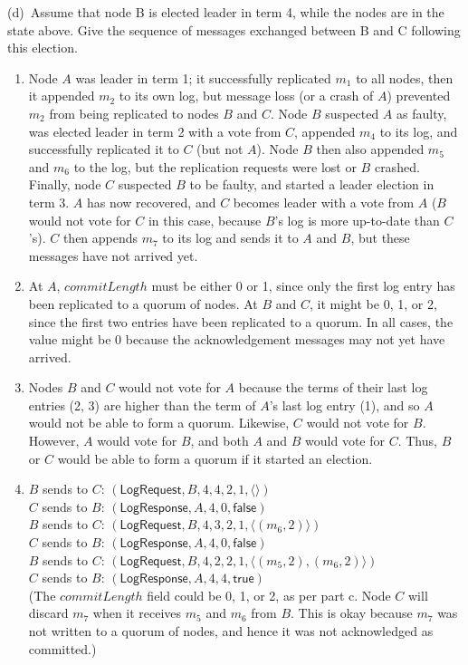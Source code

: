 {    \noindent (d)~Assume that node B is elected leader in term 4, while the nodes are in the state above.
    Give the sequence of messages exchanged between B and C following this election.
}{
    \begin{enumerate} \renewcommand{\theenumi}{\alph{enumi}} %
        \item Node $A$ was leader in term 1; it successfully replicated $m_1$ to all nodes, then it appended $m_2$ to its own log, but message loss (or a crash of $A$) prevented $m_2$ from being replicated to nodes $B$ and $C$.
            Node $B$ suspected $A$ as faulty, was elected leader in term 2 with a vote from $C$, appended $m_4$ to its log, and successfully replicated it to $C$ (but not $A$).
            Node $B$ then also appended $m_5$ and $m_6$ to the log, but the replication requests were lost or $B$ crashed.
            Finally, node $C$ suspected $B$ to be faulty, and started a leader election in term 3.
            $A$ has now recovered, and $C$ becomes leader with a vote from $A$ ($B$ would not vote for $C$ in this case, because $B$'s log is more up-to-date than $C$'s).
            $C$ then appends $m_7$ to its log and sends it to $A$ and $B$, but these messages have not arrived yet.
        \item At $A$, $\mathit{commitLength}$ must be either 0 or 1, since only the first log entry has been replicated to a quorum of nodes.
            At $B$ and $C$, it might be 0, 1, or 2, since the first two entries have been replicated to a quorum.
            In all cases, the value might be 0 because the acknowledgement messages may not yet have arrived.
        \item Nodes $B$ and $C$ would not vote for $A$ because the terms of their last log entries (2, 3) are higher than the term of $A$'s last log entry (1), and so $A$ would not be able to form a quorum.
            Likewise, $C$ would not vote for $B$.
            However, $A$ would vote for $B$, and both $A$ and $B$ would vote for $C$.
            Thus, $B$ or $C$ would be able to form a quorum if it started an election.
        \item $B$ sends to $C$: $(\mathsf{LogRequest}, B, 4, 4, 2, 1, \langle\rangle)$ \\
            $C$ sends to $B$: $(\mathsf{LogResponse}, A, 4, 0, \mathsf{false})$ \\
            $B$ sends to $C$: $(\mathsf{LogRequest}, B, 4, 3, 2, 1, \langle(m_6, 2)\rangle)$ \\
            $C$ sends to $B$: $(\mathsf{LogResponse}, A, 4, 0, \mathsf{false})$ \\
            $B$ sends to $C$: $(\mathsf{LogRequest}, B, 4, 2, 2, 1, \langle(m_5, 2), (m_6, 2)\rangle)$ \\
            $C$ sends to $B$: $(\mathsf{LogResponse}, A, 4, 4, \mathsf{true})$ \\
            (The $\mathit{commitLength}$ field could be 0, 1, or 2, as per part c. Node $C$ will discard $m_7$ when it receives $m_5$ and $m_6$ from $B$. This is okay because $m_7$ was not written to a quorum of nodes, and hence it was not acknowledged as committed.)
    \end{enumerate}
}


